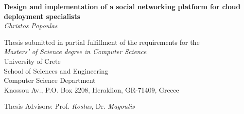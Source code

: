 \begin{titlepage}
\begin{center}

\LARGE \textbf{Design and implementation of a social networking platform for cloud deployment specialists}\\[0.5cm]
\LARGE \textit{Christos Papoulas}\\[0.5cm]

\vfill

\normalsize{
Thesis submitted in partial fulfillment of the requirements for the\\[0.30cm]

\textit{Masters' of Science degree in Computer Science}}\\[0.30cm]

University of Crete\\
School of Sciences and Engineering\\
Computer Science Department\\
Knossou Av., P.O. Box 2208, Heraklion, GR-71409, Greece\\[0.5cm]

\vfill

\Large{Thesis Advisors: Prof. \emph{Kostas}, Dr. \emph{Magoutis}}\\[0.5cm]

\vfill

\end{center}

\worksupportedby{}
\end{titlepage}
